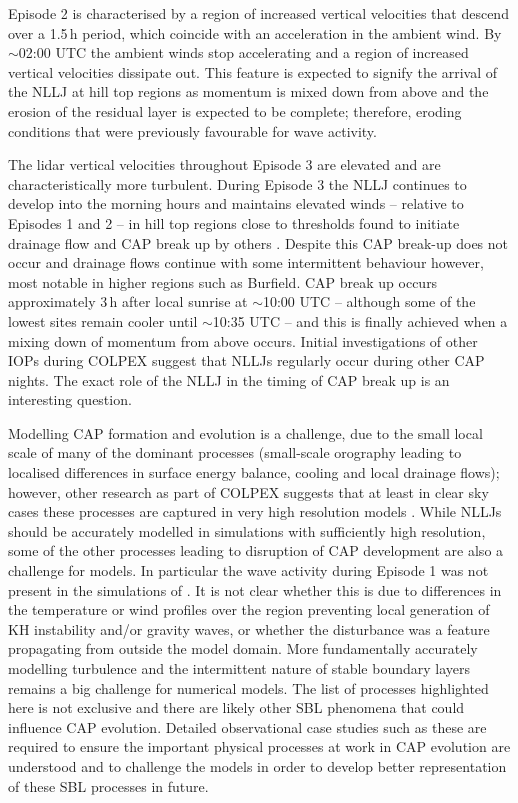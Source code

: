 \documentclass[times]{qjrms4}
\begin{document}
Episode 2 is characterised by a region of increased vertical velocities that descend over a 1.5$\,\mbox{h}$ period, which coincide with an acceleration in the ambient wind. By $\sim$02:00 UTC the ambient winds stop accelerating and a region of increased vertical velocities dissipate out. This feature is expected to signify the arrival of the NLLJ at hill top regions as momentum is mixed down from above and the erosion of the residual layer is expected to be complete; therefore, eroding conditions that were previously favourable for wave activity.

The lidar vertical velocities throughout Episode 3 are elevated and are characteristically more turbulent. During Episode 3 the NLLJ continues to develop into the morning hours and maintains elevated winds -- relative to Episodes 1 and 2 -- in hill top regions close to thresholds found to initiate drainage flow and CAP break up by others \citep{barr1989influence,orgill1992mesoscale,bogren2000local,iijima2000seasonal,whiteman2001cold,vosper2008numerical}.  Despite this CAP break-up does not occur and drainage flows continue with some intermittent behaviour however, most notable in higher regions such as Burfield. CAP break up occurs approximately 3$\,\mbox{h}$ after local sunrise at $\sim$10:00 UTC -- although some of the lowest sites remain cooler until $\sim$10:35 UTC -- and this is finally achieved when a mixing down of momentum from above occurs. Initial investigations of other IOPs during COLPEX suggest that NLLJs regularly occur during other CAP nights. The exact role of the NLLJ in the timing of CAP break up is an interesting question.

Modelling CAP formation and evolution is a challenge, due to the small local scale of many of the dominant processes (small-scale orography leading to localised differences in surface energy balance, cooling and local drainage flows); however, other research as part of COLPEX suggests that at least in clear sky cases these processes are captured in very high resolution models \citep{vosper2013high,Vosper2013narrow,hughes2015assessment}. While NLLJs should be accurately modelled in simulations with sufficiently high resolution, some of the other processes leading to disruption of CAP development are also a challenge for models. In particular the wave activity during Episode 1 was not present in the simulations of \citet{Vosper2013narrow}. It is not clear whether this is due to differences in the temperature or wind profiles over the region preventing local generation of KH instability and/or gravity waves, or whether the disturbance was a feature propagating from outside the model domain. More fundamentally accurately modelling turbulence and the intermittent nature of stable boundary layers remains a big challenge for numerical models. The list of processes highlighted here is not exclusive and there are likely other SBL phenomena that could influence CAP evolution. Detailed observational case studies such as these are required to ensure the important physical processes at work in CAP evolution are understood and to challenge the models in order to develop better representation of these SBL processes in future. 
\end{document}
